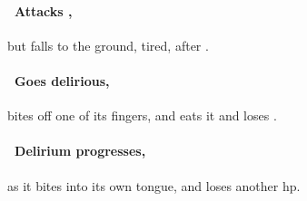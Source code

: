 \documentclass[10pt,twoside]{book}
\begin{document}
\paragraph{\Square~Attacks ,}
but falls to the ground, tired, after .

\paragraph{\Square~Goes delirious,}
bites off one of its fingers, and eats it and loses .

\paragraph{\Square~Delirium progresses,}
as it bites into its own tongue, and loses another \gls{hp}.


\end{document}
